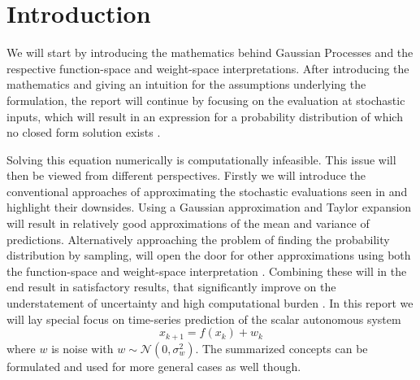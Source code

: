 \section{Introduction}
\label{s:Introduction}
We will start by introducing the mathematics behind Gaussian Processes and the respective function-space and weight-space interpretations. After introducing the mathematics and giving an intuition for the assumptions underlying the formulation, the report will continue by focusing on the evaluation at stochastic inputs, which will result in an expression for a probability distribution of which no closed form solution exists \cite{Paper2:UncertainInputPredictions,Paper3:GPPriorsWithUncertainInputs}. \newline

Solving this equation numerically is computationally infeasible. This issue will then be viewed from different perspectives. Firstly we will introduce the conventional approaches of approximating the stochastic evaluations seen in \cite{Paper4:TrajecotryPrediction_Taylorexpansion} and highlight their downsides. Using a Gaussian approximation and Taylor expansion \cite{Paper2:UncertainInputPredictions} will result in relatively good approximations of the mean and variance of predictions. Alternatively approaching the problem of finding the probability distribution by sampling, will open the door for other approximations using both the function-space and weight-space interpretation \cite{Paper4:TrajecotryPrediction_Taylorexpansion}. Combining these will in the end result in satisfactory results, that significantly improve on the understatement of uncertainty and high computational burden \cite{Paper5:PriorPosteriorSplit}. In this report we will lay special focus on time-series prediction of the scalar autonomous system  
\begin{equation}
    \label{eq:scalarautonomous}
     x_{k+1} = f(x_k) + w_k  
\end{equation}
where $w$ is noise with $w \sim \mathcal N (0,\sigma_w^2)$. The summarized concepts can be formulated and used for more general cases as well though.